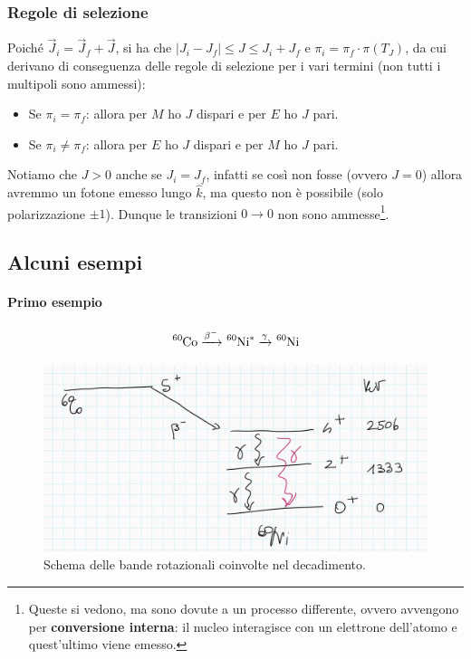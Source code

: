 \subsubsection{Regole di selezione}
Poiché $\vec{J}_i = \vec{J}_f + \vec{J}$, si ha che $|J_i - J_f|\leq J\leq J_i+J_f$ e $\pi_i = \pi_f \cdot \pi(T_J)$, da cui derivano di conseguenza delle regole di selezione per i vari termini (non tutti i multipoli sono ammessi):
\begin{itemize}
    \item Se $\pi_i = \pi_f$: allora per $M$ ho $J$ dispari e per $E$ ho $J$ pari.
    \item Se $\pi_i \not = \pi_f$: allora per $E$ ho $J$ dispari e per $M$ ho $J$ pari.
\end{itemize}
Notiamo che $J > 0$ anche se $J_i=J_f$, infatti se così non fosse (ovvero $J=0$) allora avremmo un fotone emesso lungo $\hat{k}$, ma questo non è possibile (solo polarizzazione $\pm 1$). Dunque le transizioni $0\to 0$ non sono ammesse\footnote{Queste si vedono, ma sono dovute a un processo differente, ovvero avvengono per \textbf{conversione interna}: il nucleo interagisce con un elettrone dell'atomo e quest'ultimo viene emesso.}.

\subsection{Alcuni esempi}
\paragraph{Primo esempio}
$$\ce{^{60}Co}  \xrightarrow{\beta^-} \ce{^{60}Ni}^*  \xrightarrow{\gamma}  \ce{^{60}Ni}$$

\begin{figure}[h]
    \centering
    \includegraphics[scale=0.2]{Immagini/0310_bande.png}
    \caption{Schema delle bande rotazionali coinvolte nel decadimento.}
    \label{0310_bande}
\end{figure}

